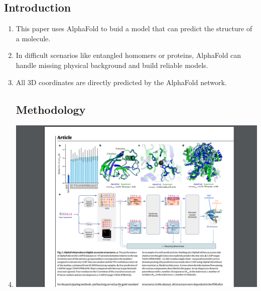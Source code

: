 \documentclass[]{report}
\begin{document}
	\subsection{Introduction}
	\begin{enumerate}
	\item This paper uses AlphaFold to buid a model that can predict the structure of a molecule.
	\item In difficult scenarios like entangled homomers or proteins, AlphaFold can handle missing physical background and build reliable models.
	\item All 3D coordinates are directly predicted by the AlphaFold network.
	\subsection{Methodology}
	\item 	\includegraphics[width=\linewidth]{AlphaFold}
	\end{enumerate}
\end{document}
